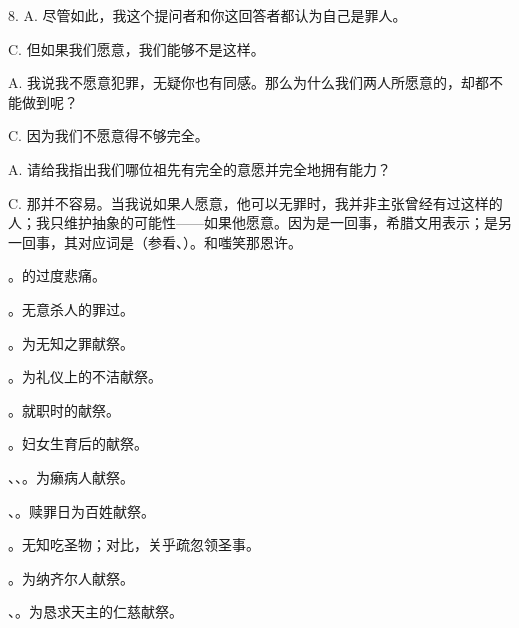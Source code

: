 8. A. 尽管如此，我这个提问者和你这回答者都认为自己是罪人。\par

C. 但如果我们愿意，我们能够不是这样。\par

A. 我说我不愿意犯罪，无疑你也有同感。那么为什么我们两人所愿意的，却都不能做到呢？\par

C. 因为我们不愿意得不够完全。\par

A. 请给我指出我们哪位祖先有完全的意愿并完全地拥有能力？\par

C. 那并不容易。当我说如果人愿意，他可以无罪时，我并非主张曾经有过这样的人；我只维护抽象的可能性——如果他愿意。因为是一回事，希腊文用表示；是另一回事，其对应词是（参看、）。和嗤笑那恩许。\par

。的过度悲痛。\par

。无意杀人的罪过。\par

。为无知之罪献祭。\par

。为礼仪上的不洁献祭。\par

。就职时的献祭。\par

。妇女生育后的献祭。\par

、、。为癞病人献祭。\par

、。赎罪日为百姓献祭。\par

。无知吃圣物；对比，关乎疏忽领圣事。\par

。为纳齐尔人献祭。\par

、。为恳求天主的仁慈献祭。\par

